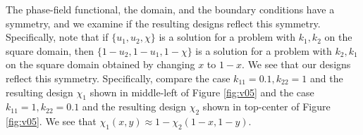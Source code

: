 \documentclass[11pt]{article}
\begin{document}
The phase-field functional, the domain, and the boundary conditions have a symmetry, and we examine if the resulting designs reflect this symmetry.  Specifically, note that if $\{u_1, u_2, \chi\}$ is a solution for a problem with $k_1,k_2$ on the square domain, then $\{1-u_2, 1-u_1, 1-\chi\}$ is a solution for a problem with $k_2,k_1$ on the square domain obtained by changing $x$ to $1-x$.  We see that our designs reflect this symmetry.  Specifically, compare the case $k_{11}=0.1,k_{22}=1$ and the resulting design $\chi_1$ shown in middle-left of Figure \ref{fig:v05} and the case $k_{11}=1,k_{22}=0.1$ and the resulting design $\chi_2$ shown in top-center of Figure \ref{fig:v05}.  We see that $\chi_1(x,y) \approx 1-\chi_2(1-x,1-y)$.  
\end{document}
